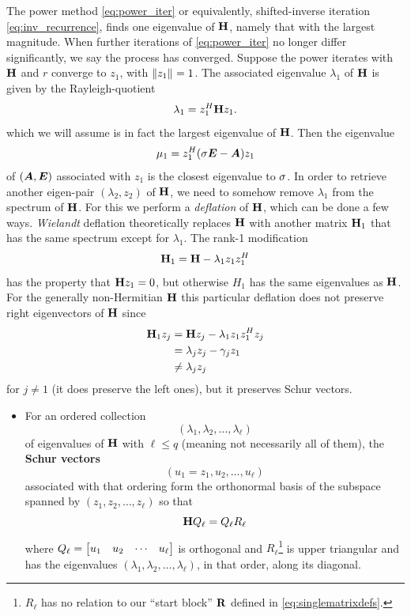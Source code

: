 \smallskip
The power method \eqref{eq:power_iter} or equivalently, shifted-inverse iteration \eqref{eq:inv_recurrence}, finds one eigenvalue of $\textbf{\textup{H}}$, namely that with the largest magnitude. 
When further iterations of \eqref{eq:power_iter} no longer differ significantly, we say the process has converged. Suppose the power iterates with $\textbf{\textup{H}}$ and $r$ converge to $z_1$, with $\left\| z_1 \right\|_{}=1$.    The associated eigenvalue $\lambda_1$ of $\textbf{\textup{H}}$   is given by the Rayleigh-quotient
\[
\lambda_1 = z^H_1 \textbf{\textup{H}} z_1.
\] 
which we will assume is in fact the largest eigenvalue of $\textbf{\textup{H}}$.  Then the eigenvalue
 \[
\mu_1 = z_1^H(\sigma \bm{E} - \bm{A}) z_1 
\]
of $(\bm{A},\bm{E})$ associated with $z_1$ is the closest eigenvalue to $\sigma$.
In order to retrieve another eigen-pair $(\lambda_2,z_2)$ of $\textbf{\textup{H}}$, we need to somehow remove $\lambda_1 $ from the spectrum of $\textbf{\textup{H}}$.  For this we perform a \emph{deflation} of $\textbf{\textup{H}}$, which can be done a few ways.  \emph{Wielandt} deflation theoretically replaces $\textbf{\textup{H}}$ with another matrix $\textbf{\textup{H}}_1$ that has the same spectrum except for $\lambda_1$.   The rank-1 modification
\[
\textbf{\textup{H}}_1 = \textbf{\textup{H}} - \lambda_1 z_1 z_1^H
\]
has the property that $\textbf{\textup{H}} z_1 = 0$, but otherwise $H_1$ has the same eigenvalues as $\textbf{\textup{H}}$.  For the generally non-Hermitian $\textbf{\textup{H}}$ this particular deflation does not preserve right eigenvectors of $\textbf{\textup{H}}$ since 
\begin{align*}
\textbf{\textup{H}}_1 z_j &= \textbf{\textup{H}} z_j - \lambda_1 z_1 z_1^H z_j \\
   &= \lambda_j z_j - \gamma_j z_1\\
&\neq  \lambda_j z_j
\end{align*}
for $j\neq 1$ (it does preserve the left ones),  but it preserves  Schur vectors.  
\begin{itemize}
\item For an ordered collection 
\[
(\lambda_1, \lambda_2, \ldots,\lambda_\ell)
\]
of eigenvalues of $\textbf{\textup{H}}$ with $\ell \leq q$ (meaning not necessarily all of them), the \textbf{Schur vectors} 
\[
(u_1=z_1, u_2,\ldots,u_\ell)
\]
associated with that ordering form the orthonormal basis of the subspace spanned by $(z_1,z_2,\ldots,z_\ell)$
so that  
\[
\textbf{\textup{H}} Q_\ell = Q_\ell R_\ell
\]
where $Q_\ell=\begin{bmatrix} u_1 & u_2 & \cdots & u_\ell\end{bmatrix}$ is orthogonal and $R_\ell$\footnote{$R_\ell$ has no relation to our ``start block'' $\textbf{\textup{R}}$ defined in \eqref{eq:singlematrixdefs}.} is upper triangular and has the eigenvalues $(\lambda_1, \lambda_2, \ldots,\lambda_\ell)$, in that order, along its diagonal.   
\end{itemize}

